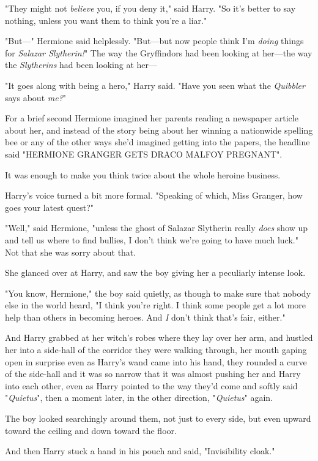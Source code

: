 "They might not \emph{believe} you, if you deny it," said Harry. "So it's
better to say nothing, unless you want them to think you're a liar."

"But\mbox{---}" Hermione said helplessly. "But---but now people think I'm \emph{doing}
things for \emph{Salazar Slytherin!}" The way the Gryffindors had been looking
at her---the way the \emph{Slytherins} had been looking at her---

"It goes along with being a hero," Harry said. "Have you seen what the
\emph{Quibbler} says about \emph{me?}"

For a brief second Hermione imagined her parents reading a newspaper article
about her, and instead of the story being about her winning a nationwide
spelling bee or any of the other ways she'd imagined getting into the papers,
the headline said "HERMIONE GRANGER GETS DRACO MALFOY PREGNANT".

It was enough to make you think twice about the whole heroine business.

Harry's voice turned a bit more formal. "Speaking of which, Miss Granger, how
goes your latest quest?"

"Well," said Hermione, "unless the ghost of Salazar Slytherin really
\emph{does} show up and tell us where to find bullies, I don't think we're
going to have much luck." Not that she was sorry about that.

She glanced over at Harry, and saw the boy giving her a peculiarly intense look.

"You know, Hermione," the boy said quietly, as though to make sure that nobody
else in the world heard, "I think you're right. I think some people get a lot
more help than others in becoming heroes. And \emph{I} don't think that's fair,
either."

And Harry grabbed at her witch's robes where they lay over her arm, and hustled
her into a side-hall of the corridor they were walking through, her mouth
gaping open in surprise even as Harry's wand came into his hand, they rounded a
curve of the side-hall and it was so narrow that it was almost pushing her and
Harry into each other, even as Harry pointed to the way they'd come and softly
said "\emph{Quietus}", then a moment later, in the other direction,
"\emph{Quietus}" again.

The boy looked searchingly around them, not just to every side, but even upward
toward the ceiling and down toward the floor.

And then Harry stuck a hand in his pouch and said, "Invisibility cloak."

